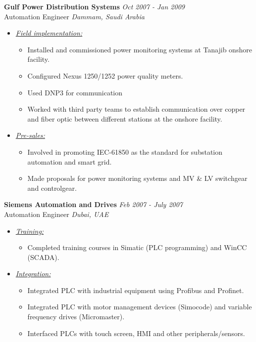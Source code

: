 \documentclass{article}
\begin{document}
    {\bf Gulf Power Distribution Systems} \hfill {\em Oct 2007 - Jan 2009} \\
    Automation Engineer \hfill {\em Dammam, Saudi Arabia} \\
    \begin{itemize}
    \item \underline{\it Field implementation:}
          \begin{itemize}
          \item Installed and commissioned power monitoring systems at Tanajib
                onshore facility.
          \item Configured Nexus 1250/1252 power quality meters.
          \item Used DNP3 for communication
          \item Worked with third party teams to establish communication over
                copper and fiber optic between different stations at the onshore
                facility.
          \end{itemize}
    \item \underline{\it Pre-sales:}
          \begin{itemize}
          \item Involved in promoting IEC-61850 as the standard for substation
                automation and smart grid.
          \item Made proposals for power monitoring systems and MV \&
                LV switchgear and controlgear.
          \end{itemize}
    \end{itemize}
    \bigskip

    {\bf Siemens Automation and Drives} \hfill {\em Feb 2007 - July 2007} \\
    Automation Engineer \hfill {\em Dubai, UAE} \\
    \begin{itemize}
    \item \underline{\it Training:}
          \begin{itemize}
          \item Completed training courses in Simatic (PLC programming) and
                WinCC (SCADA).
          \end{itemize}
    \item \underline{\it Integration:}
          \begin{itemize}
          \item Integrated PLC with industrial equipment using Profibus and
                Profinet.
          \item Integrated PLC with motor management devices (Simocode) and
                variable frequency drives (Micromaster).
          \item Interfaced PLCs with touch screen, HMI and other
                peripherals/sensors.
          \end{itemize}
    \end{itemize}
    \bigskip
\end{document}
